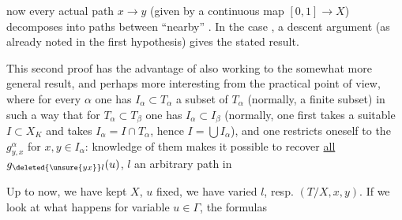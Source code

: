 now every actual path $x\longrightarrow y$ (given by a continuous map $[0,1]\longrightarrow X$) decomposes into   paths
between ``nearby''  . In the  case , a descent argument (as already noted in the first hypothesis) gives the stated result.

This second proof has the advantage of also working to  the somewhat more general result, and perhaps more interesting from the practical point of view, where for every $\alpha$ one has $I_\alpha\subset T_\alpha$ a  subset of $T_\alpha$ (normally, a finite subset) in such a way that for $T_\alpha\subset T_\beta$ one has $I_\alpha\subset I_\beta$  (normally, one first takes a suitable $I\subset X_K$ and takes $I_\alpha=I\cap T_\alpha$, hence $I=\bigcup I_\alpha$), and one restricts oneself to the $g^\alpha_{y,x}$ for $x,y\in I_\alpha$: knowledge of them makes it possible to recover \uline{all}  $g_{\deleted{\unsure{yx}}l}(u)$, $l$ an arbitrary path in


Up to now, we have kept $X$, $u$ fixed, we have varied $l$, resp. $(T/X,x,y)$. If we look at what happens for variable $u\in\Gamma$, the formulas
